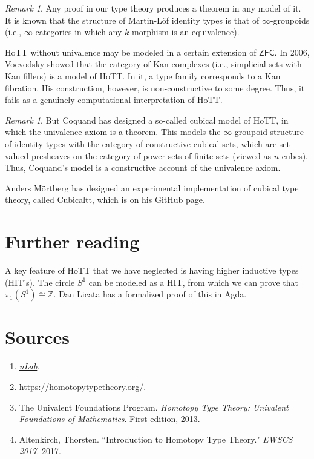 \documentclass[10pt,letterpaper,cm]{nupset}
\theoremstyle{definition}
\theoremstyle{theorem}
\theoremstyle{remark}
\newtheorem{remark}[definition]{Remark}
\newcommand{\Z}{\mathbb Z}
\newcommand{\1}{\mathbf{1}}
\newcommand{\0}{\vec 0}
\begin{document}
\begin{remark} Any proof in our type theory produces a theorem in any model of it. It is known that the structure of Martin-L\"of identity types is that of $\infty$-groupoids (i.e., $\infty$-categories in which any $k$-morphism is an equivalence).

HoTT without univalence may be modeled in a certain extension of $\mathsf{ZFC}$. In 2006, Voevodsky showed that the category of Kan complexes (i.e., simplicial sets with Kan fillers) is a model of HoTT.  In it, a type family corresponds to a Kan fibration.  His construction, however, is non-constructive to some degree. Thus, it fails as a genuinely computational interpretation of HoTT.
\end{remark}

\begin{remark}
But Coquand has designed a so-called cubical model of HoTT, in which the univalence axiom is a theorem. This models the $\infty$-groupoid structure of identity types with the category of constructive cubical sets, which are set-valued presheaves on the category of power sets of finite sets (viewed as $n$-cubes). Thus, Coquand's model is a constructive account of the univalence axiom.  

Anders M\"ortberg has designed an experimental implementation of cubical type theory, called Cubicaltt, which is on his GitHub page.
\end{remark}

\section*{Further reading}

A key feature of HoTT that we have neglected is having higher inductive types (HIT's). The circle $S^1$ can be modeled as a HIT, from which we can prove that $\pi_1(S^1) \cong \Z$. Dan Licata has a formalized proof of this in Agda.

\section*{Sources}

\begin{enumerate}
\item \href{https://ncatlab.org/nlab/show/HomePage}{\textit{nLab}}.
\item \url{https://homotopytypetheory.org/}.
\item The Univalent Foundations Program. \textit{Homotopy Type Theory: Univalent Foundations of Mathematics}. First edition, 2013.
\item Altenkirch, Thorsten. ``Introduction to Homotopy Type Theory." \textit{EWSCS 2017}. 2017.
\end{enumerate}
\end{document}
